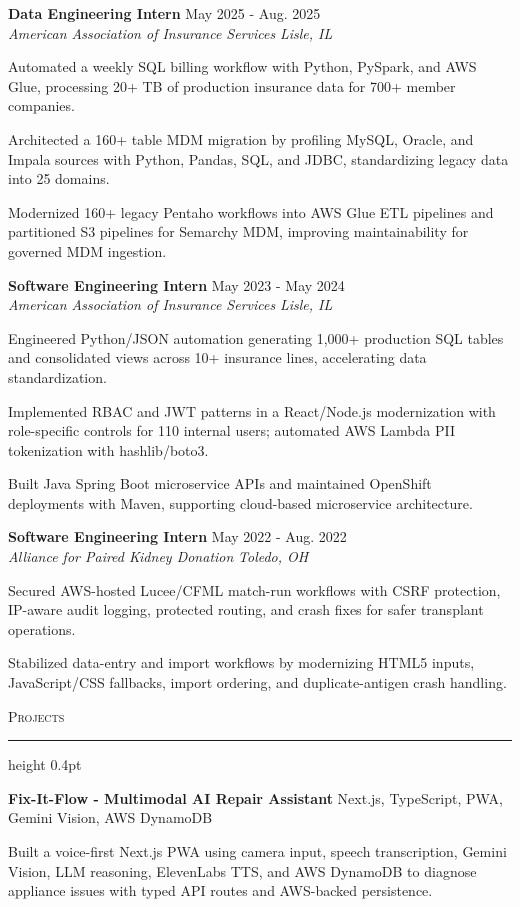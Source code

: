 \documentclass[letterpaper,11pt]{article}
\newcommand{\resumesection}[1]{%
  \par\vspace{2pt}%
  {\large\scshape #1}\par\vspace{2pt}%
  \hrule height 0.4pt\vspace{2pt}%
}
\newcommand{\resumeSubheading}[4]{
  \textbf{#1} \hfill #2\\
  \textit{#3} \hfill \textit{#4}
}
\newcommand{\projectHeading}[2]{
  \textbf{#1} \hfill #2
}
\begin{document}
\resumeSubheading
{Data Engineering Intern}{May 2025 - Aug. 2025}
{American Association of Insurance Services}{Lisle, IL}
\begin{tightitemize}
  \item Automated a weekly SQL billing workflow with Python, PySpark, and AWS Glue, processing 20+ TB of production insurance data for 700+ member companies.
  \item Architected a 160+ table MDM migration by profiling MySQL, Oracle, and Impala sources with Python, Pandas, SQL, and JDBC, standardizing legacy data into 25 domains.
  \item Modernized 160+ legacy Pentaho workflows into AWS Glue ETL pipelines and partitioned S3 pipelines for Semarchy MDM, improving maintainability for governed MDM ingestion.
\end{tightitemize}

\resumeSubheading
{Software Engineering Intern}{May 2023 - May 2024}
{American Association of Insurance Services}{Lisle, IL}
\begin{tightitemize}
  \item Engineered Python/JSON automation generating 1,000+ production SQL tables and consolidated views across 10+ insurance lines, accelerating data standardization.
  \item Implemented RBAC and JWT patterns in a React/Node.js modernization with role-specific controls for 110 internal users; automated AWS Lambda PII tokenization with hashlib/boto3.
  \item Built Java Spring Boot microservice APIs and maintained OpenShift deployments with Maven, supporting cloud-based microservice architecture.
\end{tightitemize}

\resumeSubheading
{Software Engineering Intern}{May 2022 - Aug. 2022}
{Alliance for Paired Kidney Donation}{Toledo, OH}
\begin{tightitemize}
  \item Secured AWS-hosted Lucee/CFML match-run workflows with CSRF protection, IP-aware audit logging, protected routing, and crash fixes for safer transplant operations.
  \item Stabilized data-entry and import workflows by modernizing HTML5 inputs, JavaScript/CSS fallbacks, import ordering, and duplicate-antigen crash handling.
\end{tightitemize}

\resumesection{Projects}
\projectHeading{Fix-It-Flow - Multimodal AI Repair Assistant}{Next.js, TypeScript, PWA, Gemini Vision, AWS DynamoDB}
\begin{tightitemize}
  \item Built a voice-first Next.js PWA using camera input, speech transcription, Gemini Vision, LLM reasoning, ElevenLabs TTS, and AWS DynamoDB to diagnose appliance issues with typed API routes and AWS-backed persistence.
\end{tightitemize}
\end{document}
